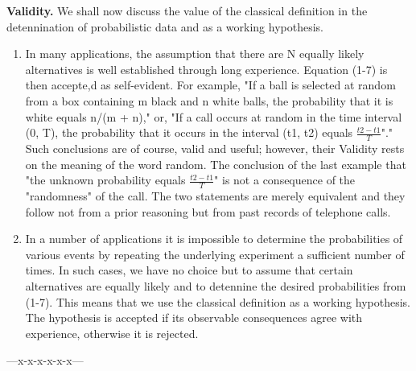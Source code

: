 \documentclass[journal,12pt,twocolumn]{IEEEtran}
\begin{document}
\textbf{Validity.} We shall now discuss the value of the classical definition in the detennination of probabilistic data and as a working hypothesis.

\begin{enumerate}[label=(\Alph*)]
\item In many applications, the assumption that there are N equally likely alternatives is well established through long experience. Equation (1-7) is then accepte,d as self-evident. For example, "If a ball is selected at random from a box containing m black and n white balls, the probability that it is white equals n/(m + n)," or, "If a call occurs at random in the time interval (0, T), the probability that it occurs in the interval (t1, t2) equals $\frac {t2 - t1} {T}$"."\\

Such conclusions are of course, valid and useful; however, their Validity rests on the meaning of the word random. The conclusion of the last example that "the unknown probability equals $\frac {t2 - t1} {T}$" is not a consequence of the "randomness" of the call. The two statements are merely equivalent and they follow not from a prior reasoning but from past records of telephone calls.\\

\item In a number of applications it is impossible to determine the probabilities of various events by repeating the underlying experiment a sufficient number of times. In such cases, we have no choice but to assume that certain alternatives are equally likely and to detennine the desired probabilities from (1-7). This means that we use the classical definition as a working hypothesis. The hypothesis is accepted if its observable consequences agree with experience, otherwise it is rejected.
\end{enumerate}

\begin{center} ---x-x-x-x-x-x--- \end{center}
\end{document}
